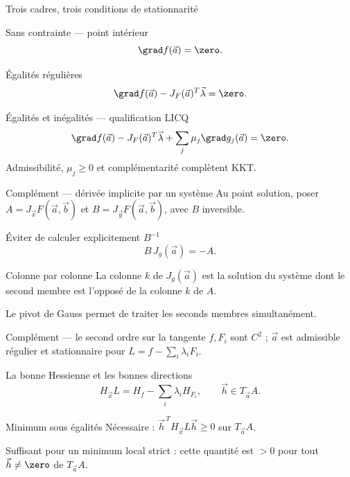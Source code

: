 \begin{frame}[t]{Trois cadres, trois conditions de stationnarité}
\coursanalyse
\setlength{\abovedisplayskip}{3pt}\setlength{\belowdisplayskip}{3pt}\begin{cours}{Sans contrainte — point intérieur}
\[\grad f(\vec a)=\zero.\]
\end{cours}
\begin{cours}{Égalités régulières}
\[\grad f(\vec a)-J_F(\vec a)^T\vec\lambda=\zero.\]
\end{cours}
\begin{cours}{Égalités et inégalités — qualification LICQ}
\[\grad f(\vec a)-J_F(\vec a)^T\vec\lambda+\sum_j\mu_j\grad g_j(\vec a)=\zero.\]
Admissibilité, $\mu_j\ge0$ et complémentarité complètent KKT.
\end{cours}
\end{frame}

\begin{frame}[t]{Complément — dérivée implicite par un système}
\coursanalyse
{}
Au point solution, poser $A=J_{\vec x}F(\vec a,\vec b)$ et $B=J_{\vec y}F(\vec a,\vec b)$, avec $B$ inversible.
\begin{resultat}{Éviter de calculer explicitement $B^{-1}$}
\[B\,J_g(\vec a)=-A.\]
\end{resultat}
\begin{cours}{Colonne par colonne}
La colonne $k$ de $J_g(\vec a)$ est la solution du système dont le second membre est l’opposé de la colonne $k$ de $A$.
\end{cours}\vfill Le pivot de Gauss permet de traiter les seconds membres simultanément.
\end{frame}

\begin{frame}[t]{Complément — le second ordre sur la tangente}
\coursanalyse
{}
$f,F_i$ sont $C^2$ ; $\vec a$ est admissible régulier et stationnaire pour $L=f-\sum_i\lambda_iF_i$.
\begin{resultat}{La bonne Hessienne et les bonnes directions}
\[H_{\vec x}L=H_f-\sum_i\lambda_iH_{F_i},\qquad\vec h\in T_{\vec a}A.\]
\end{resultat}
\begin{cours}{Minimum sous égalités}
Nécessaire : $\vec h^{\,T}H_{\vec x}L\vec h\ge0$ sur $T_{\vec a}A$.
\medskip\par Suffisant pour un minimum local strict : cette quantité est $>0$ pour tout $\vec h\ne\zero$ de $T_{\vec a}A$.
\end{cours}
\end{frame}

